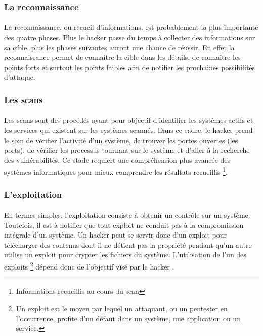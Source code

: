   \subsubsection{La reconnaissance}
    \paragraph{}
      La reconnaissance, ou recueil d’informations, est probablement la plus importante des quatre phases. Plus le hacker passe du temps à collecter des informations sur sa cible, plus les phases suivantes auront une chance de réussir\cite{c}. En effet la reconnaissance permet de connaitre la cible dans les détails, de connaître les points forts et surtout les points faibles afin de notifier les prochaines possibilités d'attaque.

  \subsubsection{Les scans}
    \paragraph{}
      Les scans sont des procédés ayant pour objectif d’identifier les systèmes actifs et les services qui existent sur les systèmes scannés. Dans ce cadre, le hacker prend le soin de vérifier l'activité d'un système, de trouver les portes ouvertes (les ports), de vérifier les processus tournant sur le système et d'aller à la recherche des vulnérabilités. Ce stade requiert une compréhension plus avancée des systèmes informatiques pour mieux comprendre les résultats recueillis \footnote{Informations recueillis au cours du scan}\cite{c}.
      
  \subsubsection{L'exploitation}
    \paragraph{}
      En termes simples, l’exploitation consiste à obtenir un contrôle sur un système. Toutefois, il est à notifier que tout exploit ne conduit pas à la compromission intégrale d’un système. Un hacker peut se servir donc d'un exploit pour télécharger des contenus dont il ne détient pas la propriété pendant qu'un autre utilise un exploit pour crypter les fichiers du système. L'utilisation de l'un des exploits \footnote{Un exploit est le moyen par lequel un attaquant, ou un pentester en l’occurrence, profite d’un défaut dans un système, une application ou un service.} dépend donc de l'objectif visé par le hacker \cite{E}.

